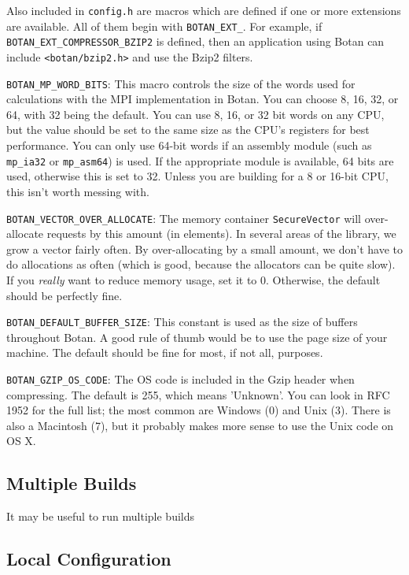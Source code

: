 \documentclass{article}
\newcommand{\filename}[1]{\texttt{#1}}
\newcommand{\module}[1]{\texttt{#1}}
\newcommand{\type}[1]{\texttt{#1}}
\newcommand{\macro}[1]{\texttt{#1}}
\begin{document}
Also included in \filename{config.h} are macros which are defined if one or
more extensions are available. All of them begin with \verb|BOTAN_EXT_|. For
example, if \verb|BOTAN_EXT_COMPRESSOR_BZIP2| is defined, then an application
using Botan can include \filename{<botan/bzip2.h>} and use the Bzip2 filters.

\macro{BOTAN\_MP\_WORD\_BITS}: This macro controls the size of the
words used for calculations with the MPI implementation in Botan. You
can choose 8, 16, 32, or 64, with 32 being the default. You can use 8,
16, or 32 bit words on any CPU, but the value should be set to the
same size as the CPU's registers for best performance. You can only
use 64-bit words if an assembly module (such as \module{mp\_ia32} or
\module{mp\_asm64}) is used. If the appropriate module is available,
64 bits are used, otherwise this is set to 32. Unless you are building
for a 8 or 16-bit CPU, this isn't worth messing with.

\macro{BOTAN\_VECTOR\_OVER\_ALLOCATE}: The memory container
\type{SecureVector} will over-allocate requests by this amount (in
elements). In several areas of the library, we grow a vector fairly often. By
over-allocating by a small amount, we don't have to do allocations as often
(which is good, because the allocators can be quite slow). If you \emph{really}
want to reduce memory usage, set it to 0. Otherwise, the default should be
perfectly fine.

\macro{BOTAN\_DEFAULT\_BUFFER\_SIZE}: This constant is used as the size of
buffers throughout Botan. A good rule of thumb would be to use the page size of
your machine. The default should be fine for most, if not all, purposes.

\macro{BOTAN\_GZIP\_OS\_CODE}: The OS code is included in the Gzip header when
compressing. The default is 255, which means 'Unknown'. You can look in RFC
1952 for the full list; the most common are Windows (0) and Unix (3). There is
also a Macintosh (7), but it probably makes more sense to use the Unix code on
OS X.

\pagebreak

\subsection{Multiple Builds}

It may be useful to run multiple builds 

\subsection{Local Configuration}
\end{document}
